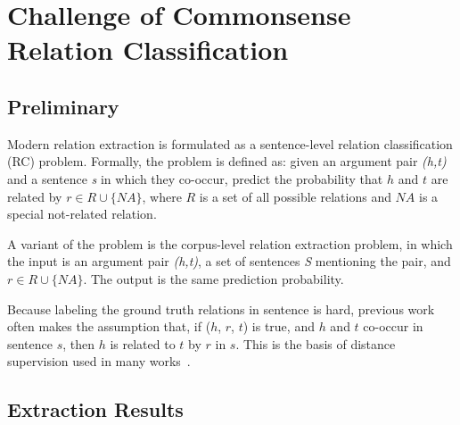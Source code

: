 \section{Challenge of Commonsense Relation Classification}
\subsection{Preliminary}
\label{sec:factual}
Modern relation extraction is formulated as a sentence-level relation classification (RC) problem.  Formally, the problem is defined as: 
given an argument pair \textit{(h,t)} and a sentence \textit{s} 
in which they co-occur, predict the probability that $h$ and $t$ are related by
$r \in R\cup\{NA\}$, where $R$ is a set of all possible relations and $NA$ is a special
not-related relation. 

A variant of the problem is the corpus-level relation extraction problem, in which
the input is an argument pair \textit{(h,t)}, a set of sentences \textit{S} 
mentioning the pair, and $r \in R \cup \{NA\}$. The output is the same prediction probability.


Because labeling the ground truth relations in sentence is hard,
previous work often makes the assumption that, if ($h$, $r$, $t$) is true,
and $h$ and $t$ co-occur in sentence $s$, then $h$ is related to $t$ by $r$ in
$s$. This is the basis of distance supervision used in many works~\cite{riedel2010modeling, mintz2009distant}.


\subsection{Extraction Results}

